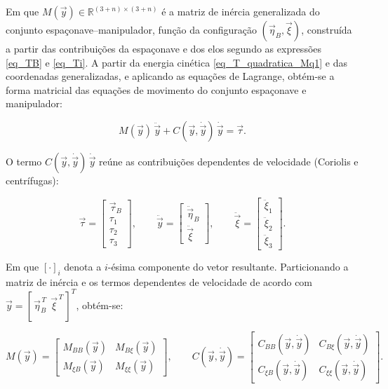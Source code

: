 Em que $M(\vec y)\in\mathbb{R}^{(3+n)\times(3+n)}$ é a matriz de inércia generalizada do conjunto espaçonave--manipulador, função da configuração $(\vec\eta_B,\vec{\xi})$, construída a partir das contribuições da espaçonave e dos elos segundo as expressões \eqref{eq_TB} e \eqref{eq_Ti}.
A partir da energia cinética \eqref{eq_T_quadratica_Mq1} e das coordenadas generalizadas, e aplicando as equações de Lagrange, obtém-se a forma matricial das equações de movimento do conjunto espaçonave e manipulador:

\begin{equation}
M(\vec y)\,\ddot{\vec y} + C(\vec y,\dot{\vec y})\,\dot{\vec y} = \vec\tau.
\label{eq_eom_acoplada_compacta}
\end{equation}

O termo $C(\vec y,\dot{\vec y})\,\dot{\vec y}$ reúne as contribuições dependentes de velocidade (Coriolis e centrífugas):


\begin{equation}
\vec\tau =
\begin{bmatrix}
\vec\tau_B \\
\tau_1 \\
\tau_2 \\
\tau_3
\end{bmatrix},
\qquad
\ddot{\vec y}=
\begin{bmatrix}
\ddot{\vec\eta}_B \\
\ddot{\vec\xi}
\end{bmatrix},
\qquad
\ddot{\vec\xi}=
\begin{bmatrix}
\ddot{\xi}_1\\
\ddot{\xi}_2\\
\ddot{\xi}_3
\end{bmatrix}.
\label{eq_tau_y_ddoty}
\end{equation}

Em que $[\cdot]_i$ denota a $i$-ésima componente do vetor resultante.
Particionando a matriz de inércia e os termos dependentes de velocidade de acordo com
$\vec y=[\,\vec\eta_B^{\,T}\ \ \vec{\xi}^{\,T}\,]^{T}$, obtém-se:

\begin{equation}
M(\vec y)=
\begin{bmatrix}
M_{BB}(\vec y) & M_{B\xi}(\vec y)\\
M_{\xi B}(\vec y) & M_{\xi\xi}(\vec y)
\end{bmatrix},
\qquad
C(\vec y,\dot{\vec y})=
\begin{bmatrix}
C_{BB}(\vec y,\dot{\vec y}) & C_{B\xi}(\vec y,\dot{\vec y})\\
C_{\xi B}(\vec y,\dot{\vec y}) & C_{\xi\xi}(\vec y,\dot{\vec y})
\end{bmatrix}.
\label{eq_particionamento_M_C}
\end{equation}

